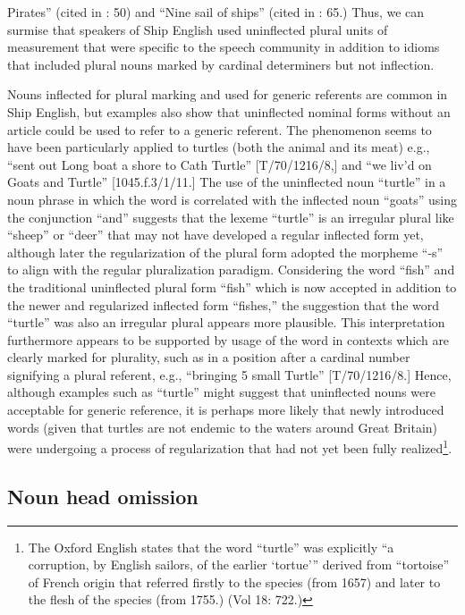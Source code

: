 Pirates” (cited in \citealt{Palmer1986}: 50) and “Nine sail of ships” (cited in \citealt{Palmer1986}: 65.) Thus, we can surmise that speakers of Ship English used uninflected plural units of measurement that were specific to the speech community in addition to idioms that included plural nouns marked by cardinal determiners but not inflection. 

Nouns inflected for plural marking and used for generic referents are common in Ship English, but examples also show that uninflected nominal forms without an article could be used to refer to a generic referent. The phenomenon seems to have been particularly applied to turtles (both the animal and its meat) e.g., “sent out Long boat a shore to Cath Turtle” [T/70/1216/8,] and “we liv’d on Goats and Turtle” [1045.f.3/1/11.] The use of the uninflected noun “turtle” in a noun phrase in which the word is correlated with the inflected noun “goats” using the conjunction “and” suggests that the lexeme “turtle” is an irregular plural like “sheep” or “deer” that may not have developed a regular inflected form yet, although later the regularization of the plural form adopted the morpheme “-s” to align with the regular pluralization paradigm. Considering the word “fish” and the traditional uninflected plural form “fish” which is now accepted in addition to the newer and regularized inflected form “fishes,” the suggestion that the word “turtle” was also an irregular plural appears more plausible. This interpretation furthermore appears to be supported by usage of the word in contexts which are clearly marked for plurality, such as in a position after a cardinal number signifying a plural referent, e.g., “bringing 5 small Turtle” [T/70/1216/8.] Hence, although examples such as “turtle” might suggest that uninflected nouns were acceptable for generic reference, it is perhaps more likely that newly introduced words (given that turtles are not endemic to the waters around Great Britain) were undergoing a process of regularization that had not yet been fully realized\footnote{The Oxford English \citet{Dictionary1989} states that the word “turtle” was explicitly “a corruption, by English sailors, of the earlier ‘tortue’” derived from “tortoise” of French origin that referred firstly to the species (from 1657) and later to the flesh of the species (from 1755.) (Vol 18: 722.)}. 

\subsection{\textbf{Noun} \textbf{head} \textbf{omission} }%

